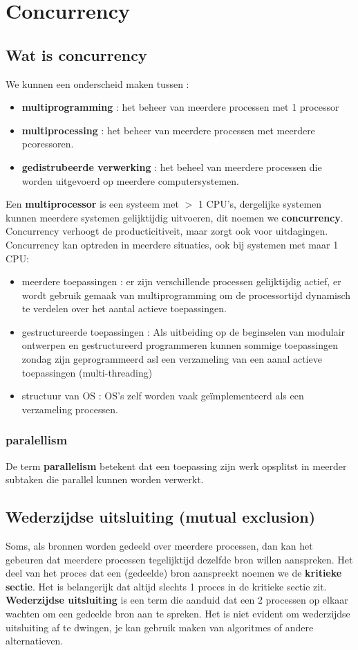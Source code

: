 \documentclass{report}
\begin{document}
   	\chapter{Concurrency}
   		\section{Wat is concurrency}
   			We kunnen een onderscheid maken tussen : 
   			\begin{itemize}
   				\item \textbf{multiprogramming} : het beheer van meerdere processen met 1 processor
   				\item \textbf{multiprocessing} : het beheer van meerdere processen met meerdere pcoressoren.
   				\item \textbf{gedistrubeerde verwerking} : het beheel van meerdere processen die worden uitgevoerd op meerdere computersystemen.
   			\end{itemize}
   			Een \textbf{multiprocessor} is een systeem met \(>\) 1 CPU's, dergelijke systemen kunnen meerdere systemen gelijktijdig uitvoeren, dit noemen we \textbf{concurrency}. Concurrency verhoogt de producticitiveit, maar zorgt ook voor uitdagingen. \\
   			Concurrency kan optreden in meerdere situaties, ook bij systemen met maar 1 CPU: 
   			\begin{itemize}
   				\item meerdere toepassingen : er zijn verschillende processen gelijktijdig actief, er wordt gebruik gemaak van multiprogramming om de processortijd dynamisch te verdelen over het aantal actieve toepassingen. 
   				\item gestructureerde toepassingen : Als uitbeiding op de beginselen van modulair ontwerpen en gestructureerd programmeren kunnen sommige toepassingen zondag zijn geprogrammeerd asl een verzameling van een aanal actieve toepassingen (multi-threading)
   				\item structuur van OS : OS's zelf worden vaak geïmplementeerd als een verzameling processen. 
   			\end{itemize}
   			\subsection{paralellism}
   				De term \textbf{parallelism} betekent dat een toepassing zijn werk opsplitst in meerder subtaken die parallel kunnen worden verwerkt.
   		\section{Wederzijdse uitsluiting (mutual exclusion)}
   			Soms, als bronnen worden gedeeld over meerdere processen, dan kan het gebeuren dat meerdere processen tegelijktijd dezelfde bron willen aanspreken. Het deel van het proces dat een (gedeelde) bron aanspreekt noemen we de \textbf{kritieke sectie}. Het is belangerijk dat altijd slechts 1 proces in de kritieke sectie zit. \textbf{Wederzijdse uitsluiting} is een term die aanduid dat een 2 processen op elkaar wachten om een gedeelde bron aan te spreken. Het is niet evident om wederzijdse uitsluiting af te dwingen, je kan gebruik maken van algoritmes of andere alternatieven. 
\end{document}
